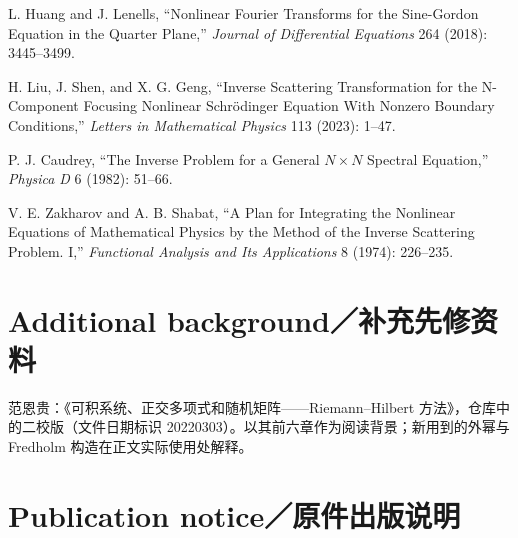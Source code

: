 \begin{enumerate}[label={[\arabic*]},leftmargin=2.8em]
\item L. Huang and J. Lenells, ``Nonlinear Fourier Transforms for the Sine-Gordon Equation in the Quarter Plane,'' \emph{Journal of Differential Equations} 264 (2018): 3445--3499.
\item H. Liu, J. Shen, and X. G. Geng, ``Inverse Scattering Transformation for the N-Component Focusing Nonlinear Schrödinger Equation With Nonzero Boundary Conditions,'' \emph{Letters in Mathematical Physics} 113 (2023): 1--47.
\item P. J. Caudrey, ``The Inverse Problem for a General $N\times N$ Spectral Equation,'' \emph{Physica D} 6 (1982): 51--66.
\item V. E. Zakharov and A. B. Shabat, ``A Plan for Integrating the Nonlinear Equations of Mathematical Physics by the Method of the Inverse Scattering Problem. I,'' \emph{Functional Analysis and Its Applications} 8 (1974): 226--235.
\end{enumerate}
\section*{Additional background／补充先修资料}
范恩贵：《可积系统、正交多项式和随机矩阵——Riemann--Hilbert 方法》，仓库中的二校版（文件日期标识 20220303）。以其前六章作为阅读背景；新用到的外幂与 Fredholm 构造在正文实际使用处解释。
\section*{Publication notice／原件出版说明}
